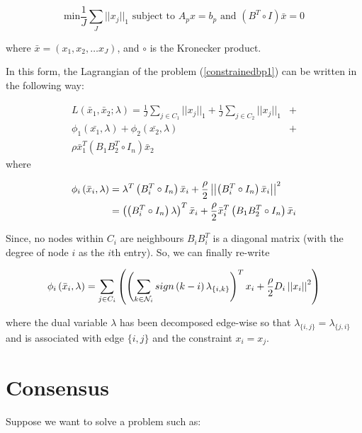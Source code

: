 \documentclass[titlepage]{article}
\begin{document}
\begin{equation}
\text{min} \frac{1}{J}\sum_J||x_j||_1 \text{ subject to } A_p x = b_p \text{ and } \left(B^T \circ I \right)\bar{x} = 0 
 \label{constrainedbp1}
\end{equation}

where \(\bar{x} = \left(x_1, x_2, \ldots x_J \right)\), and \(\circ\) is the Kronecker product. 

In this form, the Lagrangian of the problem (\ref{constrainedbp1}) can be written in the following way:

\begin{align}
L\left(\bar{x}_1, \bar{x}_2; \lambda\right) = \frac{1}{J}\sum_{j \in C_1}||x_j||_1 + \frac{1}{J}\sum_{j \in C_2}||x_j||_1 &+ \\ \phi_1\left(\bar{x_1}, \lambda\right) + \phi_2\left(\bar{x_2}, \lambda\right) &+ \\
\rho\bar{x}_1^T\left(B_1B_2^T\circ I_n\right)\bar{x}_2
\end{align}
where 

\begin{align}
\phi_i\left(\bar{x}_i, \lambda\right) &= \lambda^T\left(B_i^T\circ I_n\right)\bar{x}_i + \frac{\rho}{2}\left|\left|\left(B_i^T\circ I_n\right)\bar{x}_i \right|\right|^2 \\
&= \left(\left(B_i^T\circ I_n\right)\lambda \right)^T\bar{x}_i + \frac{\rho}{2}\bar{x}_i^T\left(B_1B_2^T\circ I_n\right)\bar{x}_i
\end{align}

Since, no nodes within \(C_i\) are neighbours \(B_iB_i^T\) is a diagonal matrix (with the degree of node \(i\) as the \(i\)th entry). So, we can finally re-write

\begin{equation}
\phi_i\left(\bar{x}_i, \lambda\right) = \sum_{j \in C_i}\left(\left(\sum_{k \in \mathcal{N}_i} sign\left(k-i\right)\lambda_{\{i,k\}}\right)^T x_i + \frac{\rho}{2}D_i\left|\left|x_i\right|\right|^2  \right)
\end{equation}

where the dual variable \(\lambda\) has been decomposed edge-wise so that \(\lambda_{\{i,j\}} = \lambda_{\{j,i\}}\) and is associated with edge \(\{i,j\}\) and the constraint \(x_i = x_j\).

\section{Consensus}
Suppose we want to solve a problem such as:
\end{document}
